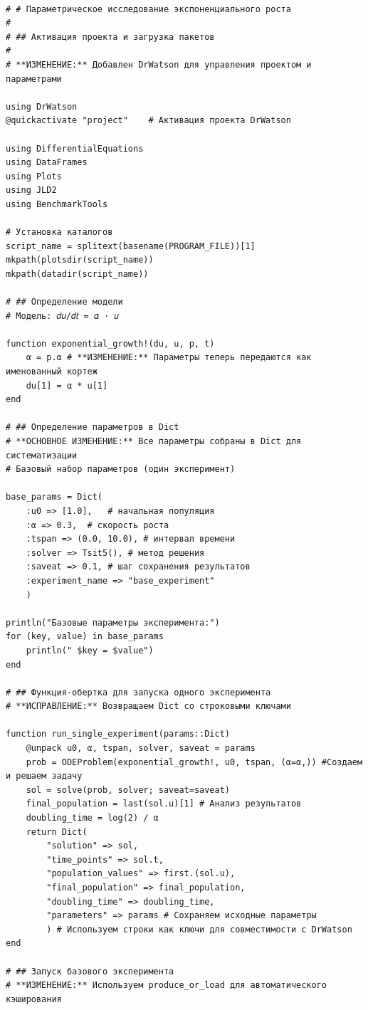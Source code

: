 \documentclass[
  english,
  russian,
  12pt,
  a4paper,
  DIV=11,
  numbers=noendperiod]{scrreprt}
\begin{document}
\begin{verbatim}

# # Параметрическое исследование экспоненциального роста
#
# ## Активация проекта и загрузка пакетов
#
# **ИЗМЕНЕНИЕ:** Добавлен DrWatson для управления проектом и параметрами

using DrWatson
@quickactivate "project"    # Активация проекта DrWatson

using DifferentialEquations
using DataFrames
using Plots
using JLD2
using BenchmarkTools

# Установка каталогов
script_name = splitext(basename(PROGRAM_FILE))[1]
mkpath(plotsdir(script_name))
mkpath(datadir(script_name))

# ## Определение модели
# Модель: 𝑑𝑢/𝑑𝑡 = 𝛼 ⋅ 𝑢

function exponential_growth!(du, u, p, t)
    α = p.α # **ИЗМЕНЕНИЕ:** Параметры теперь передаются как именованный кортеж
    du[1] = α * u[1]
end

# ## Определение параметров в Dict
# **ОСНОВНОЕ ИЗМЕНЕНИЕ:** Все параметры собраны в Dict для систематизации
# Базовый набор параметров (один эксперимент)

base_params = Dict(
    :u0 => [1.0],   # начальная популяция
    :α => 0.3,  # скорость роста
    :tspan => (0.0, 10.0), # интервал времени
    :solver => Tsit5(), # метод решения
    :saveat => 0.1, # шаг сохранения результатов
    :experiment_name => "base_experiment"
    )
    
println("Базовые параметры эксперимента:")
for (key, value) in base_params
    println(" $key = $value")
end

# ## Функция-обертка для запуска одного эксперимента
# **ИСПРАВЛЕНИЕ:** Возвращаем Dict со строковыми ключами

function run_single_experiment(params::Dict)
    @unpack u0, α, tspan, solver, saveat = params
    prob = ODEProblem(exponential_growth!, u0, tspan, (α=α,)) #Создаем и решаем задачу
    sol = solve(prob, solver; saveat=saveat)
    final_population = last(sol.u)[1] # Анализ результатов
    doubling_time = log(2) / α
    return Dict(
        "solution" => sol,
        "time_points" => sol.t,
        "population_values" => first.(sol.u),
        "final_population" => final_population,
        "doubling_time" => doubling_time,
        "parameters" => params # Сохраняем исходные параметры
        ) # Используем строки как ключи для совместимости с DrWatson
end

# ## Запуск базового эксперимента
# **ИЗМЕНЕНИЕ:** Используем produce_or_load для автоматического кэширования


\end{verbatim}
\end{document}
